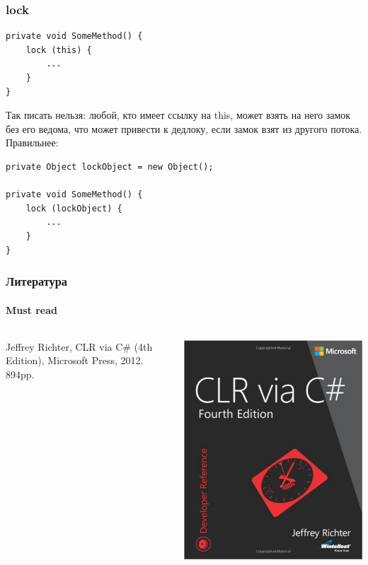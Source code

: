 \documentclass[xetex,mathserif,serif]{beamer}
\begin{document}
	\begin{frame}[fragile]
		\frametitle{lock}
		\begin{small}
			\begin{verbatim}
private void SomeMethod() {
    lock (this) {
        ...
    }
}
			\end{verbatim}
			Так писать нельзя: любой, кто имеет ссылку на this, может взять на него замок без его ведома, что может привести к дедлоку, если замок взят из другого потока. Правильнее:
			\begin{verbatim}
private Object lockObject = new Object();

private void SomeMethod() {
    lock (lockObject) {
        ...
    }
}
			\end{verbatim}
		\end{small}
	\end{frame}

	\begin{frame}
		\frametitle{Литература}
		\framesubtitle{Must read}
		\begin{columns}
			\begin{column}{0.6\textwidth}
				Jeffrey Richter, CLR via C\# (4th Edition), Microsoft Press, 2012. 894pp.
				\vspace{3cm}
			\end{column}
			\begin{column}{0.3\textwidth}
				\begin{center}
					\includegraphics[width=\textwidth]{clrViaCSharpCover.png}
				\end{center}
			\end{column}
		\end{columns}
	\end{frame}
\end{document}
